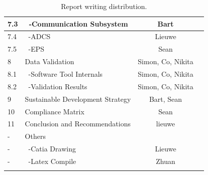 \begin{center}
\begin{longtable}{|l|l|c|c|}
 7.3     & \ -Communication Subsystem           & Bart &\\\hline
 7.4     & \ -ADCS                              & Lieuwe &\\\hline
 7.5     & \ -EPS                               & Sean &\\\hline
 8       & Data Validation                      & Simon, Co, Nikita &\\\hline
 8.1     & \ -Software Tool Internals           & Simon, Co, Nikita &\\\hline
 8.2     & \ -Validation Results                & Simon, Co, Nikita &\\\hline
 9       & Sustainable Development Strategy     &Bart, Sean &\\\hline
 10      & Compliance Matrix                    & Sean &\\\hline\hline
 11      & Conclusion and Recommendations       & lieuwe &\\\hline\hline
 -       & Others                               &&\\\hline
 -       & \ -Catia Drawing                     & Lieuwe &\\\hline
 -       & \ -Latex Compile                     & Zhuan &\\\hline

\caption{Report writing distribution.}
\label{tab:RWD}
\end{longtable}
\end{center}